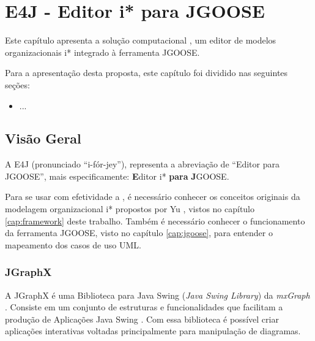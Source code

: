 % 
% 
\chapter{E4J - Editor i* para JGOOSE}
    \label{cap:proposta}
        Este capítulo apresenta a solução computacional \ferramenta{}, um editor de modelos organizacionais i* integrado à ferramenta JGOOSE.

        Para a apresentação desta proposta, este capítulo foi dividido nas seguintes seções:
            \begin{itemize}
                \item ... %
            \end{itemize}

    \section{Visão Geral}
        \label{cap:proposta-sec:overview}

        A E4J (pronunciado ``i-fór-jey''), representa a abreviação de ``Editor para JGOOSE'', mais especificamente: \textbf{E}ditor i* \textbf{para} \textbf{J}GOOSE.


        Para se usar com efetividade a \ferramenta{},
            é necessário conhecer os conceitos originais da modelagem organizacional i* propostos por Yu \cite{yu1995modelling}, vistos no capítulo \ref{cap:framework} deste trabalho.
            Também é necessário conhecer o funcionamento da ferramenta JGOOSE, visto no capítulo \ref{cap:jgoose}, para entender o mapeamento dos casos de uso UML.


        \subsection{JGraphX}
            A JGraphX é uma Biblioteca para Java Swing (\emph{Java Swing Library}) da \emph{mxGraph} \cite{mxgraph}.
                Consiste em um conjunto de estruturas e funcionalidades que facilitam a produção de Aplicações Java Swing \cite{javaswing}.
                Com essa biblioteca é possível criar aplicações interativas voltadas principalmente para manipulação de diagramas.

